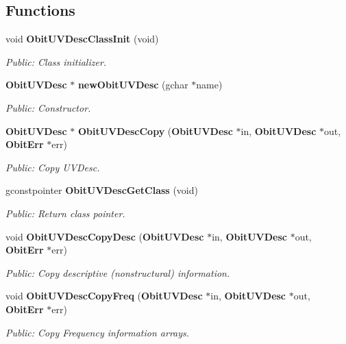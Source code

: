 \subsection*{Functions}
\begin{CompactItemize}
\item 
void {\bf Obit\-UVDesc\-Class\-Init} (void)
\begin{CompactList}\small\item\em Public: Class initializer. \item\end{CompactList}\item 
{\bf Obit\-UVDesc} $\ast$ {\bf new\-Obit\-UVDesc} (gchar $\ast$name)
\begin{CompactList}\small\item\em Public: Constructor. \item\end{CompactList}\item 
{\bf Obit\-UVDesc} $\ast$ {\bf Obit\-UVDesc\-Copy} ({\bf Obit\-UVDesc} $\ast$in, {\bf Obit\-UVDesc} $\ast$out, {\bf Obit\-Err} $\ast$err)
\begin{CompactList}\small\item\em Public: Copy UVDesc. \item\end{CompactList}\item 
gconstpointer {\bf Obit\-UVDesc\-Get\-Class} (void)
\begin{CompactList}\small\item\em Public: Return class pointer. \item\end{CompactList}\item 
void {\bf Obit\-UVDesc\-Copy\-Desc} ({\bf Obit\-UVDesc} $\ast$in, {\bf Obit\-UVDesc} $\ast$out, {\bf Obit\-Err} $\ast$err)
\begin{CompactList}\small\item\em Public: Copy descriptive (nonstructural) information. \item\end{CompactList}\item 
void {\bf Obit\-UVDesc\-Copy\-Freq} ({\bf Obit\-UVDesc} $\ast$in, {\bf Obit\-UVDesc} $\ast$out, {\bf Obit\-Err} $\ast$err)
\begin{CompactList}\small\item\em Public: Copy Frequency information arrays. \item\end{CompactList}\item 

\end{CompactItemize}
